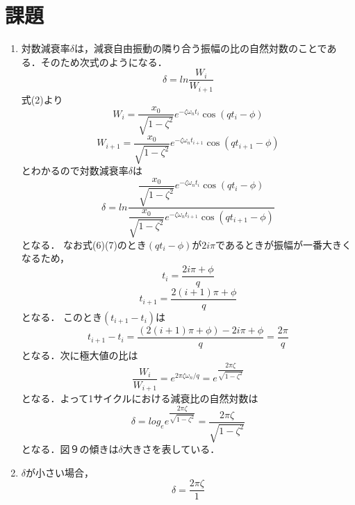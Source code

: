 \documentclass[a4paper,10.5pt]{jsarticle}
\begin{document}
\section{課題}
\begin{enumerate}
  \item 
対数減衰率$\delta$は，減衰自由振動の隣り合う振幅の比の自然対数のことである．そのため次式のようになる．
\begin{equation}
  \delta = {ln\dfrac{W_i}{W_{i+1}}}
\end{equation}
式(2)より
\begin{equation}
  W_i = {\dfrac{x_0}{\sqrt{1-\zeta^2}}e^{-\zeta {\omega}_{n} t_i}\cos (qt_i-\phi)}
\end{equation}
\begin{equation}
  W_{i+1} = {\dfrac{x_0}{\sqrt{1-\zeta^2}}e^{-\zeta {\omega}_{n} t_{i+1}}\cos (qt_{i+1}-\phi)}
\end{equation}
とわかるので対数減衰率$\delta$は
\begin{equation}
  \delta = ln{\dfrac{\dfrac{x_0}{\sqrt{1-\zeta^2}}e^{-\zeta {\omega}_{n} t_i}\cos (qt_i-\phi)}{\dfrac{x_0}{\sqrt{1-\zeta^2}}e^{-\zeta {\omega}_{n} t_{i+1}}\cos (qt_{i+1}-\phi)}}
\end{equation}
となる．
なお式(6)(7)のとき$(qt_{i}-\phi)$が$2i\pi$であるときが振幅が一番大きくなるため，
\begin{equation}
  t_i = {\dfrac{2i\pi+\phi}{q}}
\end{equation}
\begin{equation}
  t_{i+1} = {\dfrac{2(i+1)\pi+\phi}{q}}
\end{equation}
となる．
このとき$(t_{i+1}-t_{i})$は
\begin{equation}
  t_{i+1}-t_{i} = {\dfrac{(2(i+1)\pi+\phi)-2i\pi+\phi}{q}} = {\dfrac{2\pi}{q}}
\end{equation}
となる．次に極大値の比は
\begin{equation}
  {\dfrac{W_i}{W_{i+1}}} = e^{{2\pi\zeta\omega_n}/q} = e^{\dfrac{2\pi\zeta}{\sqrt{1-\zeta^2}}}
\end{equation}
となる．よって1サイクルにおける減衰比の自然対数は
\begin{equation}
  \delta = log_e{e^{\dfrac{2\pi\zeta}{\sqrt{1-\zeta^2}}}} = {\dfrac{2\pi\zeta}{\sqrt{1-\zeta^2}}}
\end{equation}
となる．図９の傾きは$\delta$大きさを表している．
  \item $\delta$が小さい場合，
  \begin{equation}
    \delta = {\dfrac{2\pi\zeta}{{1}}}
  \end{equation}

\end{enumerate}
\end{document}

